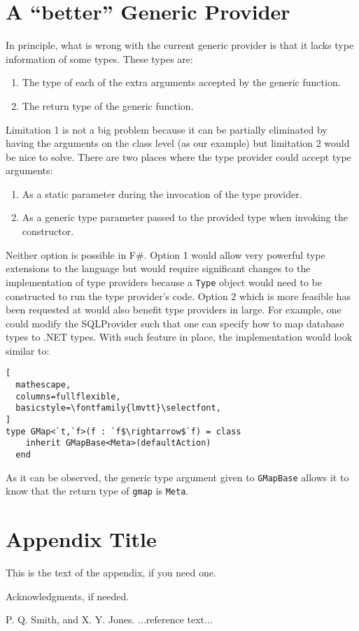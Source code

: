 \documentclass{sigplanconf}
\begin{document}
\section{A ``better'' Generic Provider}
In principle, what is wrong with the current generic provider is that
it lacks type information of some types. These types are:
\begin{enumerate}
\item The type of each of the extra arguments accepted by the generic function.
\item The return type of the generic function.
\end{enumerate}
Limitation 1 is not a big problem because it can be partially
eliminated by having the arguments on the class level (as our example)
but limitation 2 would be nice to solve. There are two places where
the type provider could accept type arguments:
\begin{enumerate}
\item As a static parameter during the invocation of the type provider.
\item As a generic type parameter passed to the provided type when invoking the constructor.
\end{enumerate}
Neither option is possible in F\#. Option 1 would allow very powerful
type extensions to the language but would require significant changes
to the implementation of type providers because a \verb+Type+ object
would need to be constructed to run the type provider's code. Option 2
which is more feasible has been requested at \cite{genericTypeArgs}
would also benefit type providers in large. For example, one could
modify the SQLProvider \cite{SQLProvider} such that one can specify
how to map database types to .NET types. With such feature in place,
the implementation would look similar to:
\begin{lstlisting}[
  mathescape,
  columns=fullflexible,
  basicstyle=\fontfamily{lmvtt}\selectfont,
]
type GMap<`t,`f>(f : `f$\rightarrow$`f) = class
    inherit GMapBase<Meta>(defaultAction)
  end
\end{lstlisting}
As it can be observed, the generic type argument given to
\verb+GMapBase+ allows it to know that the return type of \verb+gmap+
is \verb+Meta+.

\appendix
\section{Appendix Title}

This is the text of the appendix, if you need one.

\acks

Acknowledgments, if needed.




\begin{thebibliography}{}
\softraggedright

P. Q. Smith, and X. Y. Jones. ...reference text...

\end{thebibliography}
\end{document}
